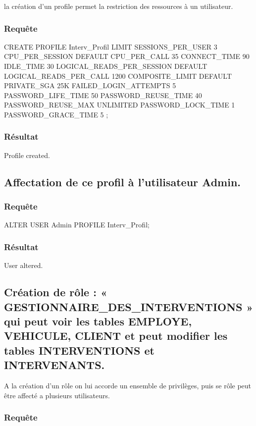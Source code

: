 \documentclass[•]{article}
\begin{document}
\textrm{la création d'un profile permet la restriction des ressources à un utilisateur.}
\subsubsection{Requête}
\begin{sql}
CREATE PROFILE Interv_Profil
LIMIT SESSIONS_PER_USER 3 
CPU_PER_SESSION DEFAULT 
CPU_PER_CALL 35 CONNECT_TIME 
90 IDLE_TIME 30 
LOGICAL_READS_PER_SESSION DEFAULT 
LOGICAL_READS_PER_CALL 1200 
COMPOSITE_LIMIT DEFAULT
PRIVATE_SGA 25K
FAILED_LOGIN_ATTEMPTS 5
PASSWORD_LIFE_TIME 50
PASSWORD_REUSE_TIME 40
PASSWORD_REUSE_MAX UNLIMITED
PASSWORD_LOCK_TIME 1 
PASSWORD_GRACE_TIME 5 ;
\end{sql}

\subsubsection{Résultat}
\begin{sql}
Profile created.
\end{sql}


\subsection{Affectation de ce profil à l’utilisateur Admin.}
\subsubsection{Requête}
\begin{sql}
ALTER USER Admin PROFILE Interv_Profil;
\end{sql}

\subsubsection{Résultat}
\begin{sql}
User altered.
\end{sql}

\subsection{Création de rôle : « GESTIONNAIRE\_DES\_INTERVENTIONS » qui peut voir les tables EMPLOYE, VEHICULE, CLIENT et peut modifier les tables INTERVENTIONS et INTERVENANTS.}

\textrm{A la création d'un rôle on lui accorde un ensemble de privilèges, puis se rôle peut être affecté a plusieurs utilisateurs. }
\subsubsection{Requête}
\end{document}
